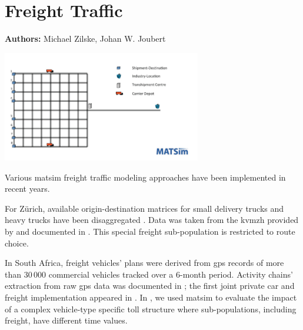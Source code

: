 \chapter{Freight Traffic}
\label{ch:freight}

\hfill \textbf{Authors:} Michael Zilske, Johan W. Joubert

\begin{center} \includegraphics[width=0.65\textwidth, angle=0]{extending/figures/freightcarriers} \end{center}



Various \gls{matsim} freight traffic modeling approaches have been implemented in recent years. 

For Zürich, available origin-destination matrices for small delivery trucks and heavy trucks have been disaggregated \citet[][]{ShahM_TechRep_IVT_2010}. Data was taken from the \gls{kvmzh} provided by \citet{AMV_Webpage_2011} and documented in \citet[][]{GottardiBuergler_SV_1999}. This special freight sub-population is restricted to route choice.

In South Africa, freight vehicles' plans were derived from \gls{gps} records of more than 30\,000 commercial vehicles tracked over a 6-month period.  Activity chains' extraction from raw \gls{gps} data was documented in \citet[][]{JoubertAxhausen_JTG_2011}; the first joint private car and freight implementation appeared in \citet[][]{JoubertJEtAl_TRR_2010}. In \citet[][]{NagelKickhoeferJoubert2014HeterogeneousVoTsPROCEDIA}, we used \gls{matsim} to evaluate the impact of a complex vehicle-type specific toll structure where sub-populations, including freight, have different time values.


